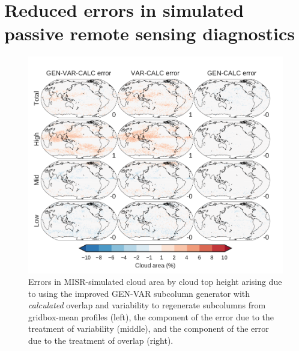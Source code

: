 \section{Reduced errors in simulated passive remote sensing
diagnostics}\label{sec:subgrid2Passive}

\begin{figure}[htbp]
\centering
\includegraphics{graphics/subgrid2_cldmisr_maps_gen-var-calc_diff.pdf}
\caption{\label{fig:subgrid2_cldmisr_maps_gen-var-calc_diff}Errors in
MISR-simulated cloud area by cloud top height arising due to using the
improved GEN-VAR subcolumn generator with \emph{calculated} overlap and
variability to regenerate subcolumns from gridbox-mean profiles (left),
the component of the error due to the treatment of variability (middle),
and the component of the error due to the treatment of overlap
(right).}\label{fig:subgrid2ux5fcldmisrux5fmapsux5fgen-var-calcux5fdiff}
\end{figure}

